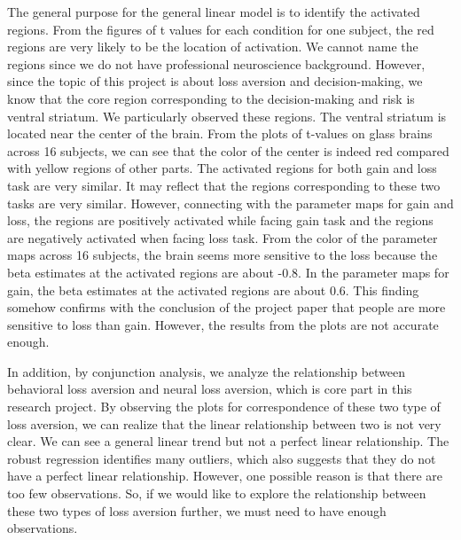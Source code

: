 \par \indent The general purpose for the general linear model is to identify 
the activated regions. From the figures of t values for each condition for one 
subject, the red regions are very likely to be the location of activation. 
We cannot name the regions since we do not have professional neuroscience 
background. However, since the topic of this project is about loss aversion 
and decision-making, we know that the core region corresponding to the 
decision-making and risk is ventral striatum. We particularly observed these 
regions. The ventral striatum is located near the center of the brain. From 
the plots of t-values on glass brains across 16 subjects, we can see that the 
color of the center is indeed red compared with yellow regions of other parts. 
The activated regions for both gain and loss task are very similar. It may 
reflect that the regions corresponding to these two tasks are very similar. 
However, connecting with the parameter maps for gain and loss, the regions are 
positively activated while facing gain task and the regions are negatively 
activated when facing loss task. From the color of the parameter maps across 16 
subjects, the brain seems more sensitive to the loss because the beta estimates 
at the activated regions are about -0.8. In the parameter maps for gain, the 
beta estimates at the activated regions are about 0.6. This finding somehow 
confirms with the conclusion of the project paper that people are more 
sensitive to loss than gain. However, the results from the plots are not 
accurate enough.

\par \indent In addition, by conjunction analysis, we analyze the relationship 
between behavioral loss aversion and neural loss aversion, which is core part 
in this research project. By observing the plots for correspondence of these 
two type of loss aversion, we can realize that the linear relationship between 
two is not very clear. We can see a general linear trend but not a perfect 
linear relationship. The robust regression identifies many outliers, which also 
suggests that they do not have a perfect linear relationship. However, one 
possible reason is that there are too few observations. So, if we would like to 
explore the relationship between these two types of loss aversion further, we 
must need to have enough observations.

